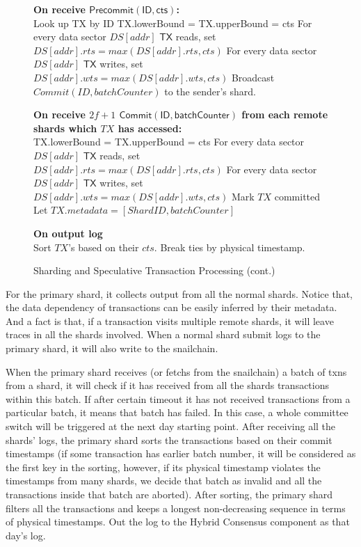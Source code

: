 \documentclass[9pt,oneside]{amsart}
\begin{document}
\begin{multicols}{2}
\begin{figure*}
\begin{algorithm}[H]
\textbf{On receive $\mathsf{Precommit(ID, cts)}$:}\\
Look up TX by ID\;
TX.lowerBound = TX.upperBound = cts\;
For every data sector $DS[addr]$ $\mathsf{TX}$ reads, set $DS[addr].rts = max(DS[addr].rts, cts)$\;
For every data sector $DS[addr]$ $\mathsf{TX}$ writes, set $DS[addr].wts = max(DS[addr].wts, cts)$\;
Broadcast $Commit(ID, batchCounter)$ to the sender's shard.\;

\textbf{On receive $2f+1$ $\mathsf{Commit(ID, batchCounter)}$ from each remote shards which $TX$ has accessed:}\\
TX.lowerBound = TX.upperBound = cts\;
For every data sector $DS[addr]$ $\mathsf{TX}$ reads, set $DS[addr].rts = max(DS[addr].rts, cts)$\;
For every data sector $DS[addr]$ $\mathsf{TX}$ writes, set $DS[addr].wts = max(DS[addr].wts, cts)$\;
Mark $TX$ committed\;
Let $TX.metadata = [ShardID, batchCounter]$\;

\textbf{On output log}\\
Sort $TX$'s based on their $cts$. Break ties by physical timestamp.

\caption{Sharding and Speculative Transaction Processing (cont.)}
\end{algorithm}
\end{figure*}

For the primary shard, it collects output from all the normal shards. Notice that, the data dependency of transactions can be easily inferred by their metadata.
And a fact is that, if a transaction visits multiple remote shards, it will leave traces in all the shards involved. When a normal shard submit logs to the primary
shard, it will also write to the snailchain.

When the primary shard receives (or fetchs from the snailchain) a batch of txns from a shard, it will check if it has received from all the shards transactions
within this batch. If after certain timeout it has not received transactions from a particular batch, it means that batch has failed. In this case, a whole committee
switch will be triggered at the next day starting point. After receiving all the shards' logs, the primary shard sorts the transactions based on their commit
timestamps (if some transaction has earlier batch number, it will be considered as the first key in the sorting, however, if its physical timestamp violates
the timestamps from many shards, we decide that batch as invalid and all the transactions inside that batch are aborted). After sorting, the primary shard
filters all the transactions and keeps a longest non-decreasing sequence in terms of physical timestamps. Out the log to the Hybrid Consensus component as that
day's log.


\end{multicols}
\end{document}
